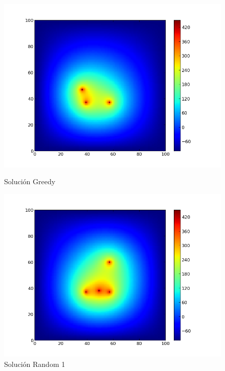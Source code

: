 \begin{figure}[htb]
\begin{center}
\includegraphics[scale=0.40]{imagenes/test6_greedy.png} 
\caption{Solución Greedy} 

        \end{center}
\endminipage\hfill
{}
\begin{center}
\includegraphics[scale=0.40]{imagenes/test6_random.png} 
\caption{Solución Random 1} 
        \end{center}
\endminipage\hfill 
\end{figure}
\clearpage
